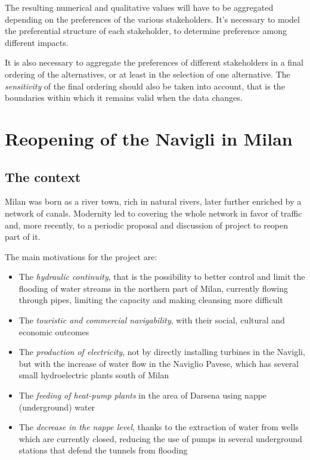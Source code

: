 The resulting numerical and qualitative values will have to be aggregated depending on the preferences of the various stakeholders. It's necessary to model the preferential structure of each stakeholder, to determine preference among different impacts.

It is also necessary to aggregate the preferences of different stakeholders in a final ordering of the alternatives, or at least in the selection of one alternative. The \textit{sensitivity} of the final ordering should also be taken into account, that is the boundaries within which it remains valid when the data changes.

\section{Reopening of the Navigli in Milan}
\label{sec:navi}

\subsection{The context}
\label{subsec:navicontext}
Milan was born as a river town, rich in natural rivers, later further enriched by a network of canals. Modernity led to covering the whole network in favor of traffic and, more recently, to a periodic proposal and discussion of project to reopen part of it.

The main motivations for the project are:
\begin{itemize}
	\item The \textit{hydraulic continuity}, that is the possibility to better control and limit the flooding of water streams in the northern part of Milan, currently flowing through pipes, limiting the capacity and making cleansing more difficult
	
	\item The \textit{touristic and commercial navigability}, with their social, cultural and economic outcomes
	
	\item The \textit{production of electricity}, not by directly installing turbines in the Navigli, but with the increase of water flow in the Naviglio Pavese, which has several small hydroelectric plants south of Milan
	
	\item The \textit{feeding of heat-pump plants} in the area of Darsena using nappe (underground) water
	
	\item The \textit{decrease in the nappe level}, thanks to the extraction of water from wells which are currently closed, reducing the use of pumps in several underground stations that defend the tunnels from flooding
\end{itemize}


